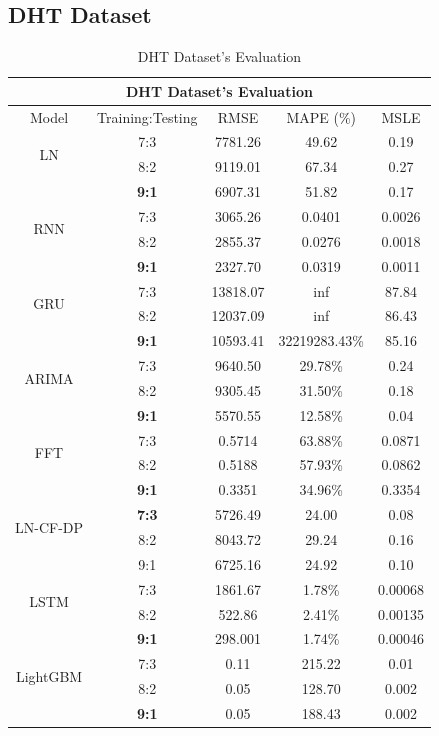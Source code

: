 \documentclass{ieeeojies}
\begin{document}
\subsection{DHT Dataset} 
\begin{table}[H]
    \centering
    \begin{tabular}{|c|c|c|c|c|}
         \hline
         \multicolumn{5}{|c|}{\textbf{DHT Dataset's Evaluation}}\\
         \hline
         \centering Model & Training:Testing & RMSE & MAPE (\%) & MSLE\\
         \hline
         \multirow{2}{*}{LN}& 7:3 & 7781.26 & 49.62 & 0.19\\ & 8:2 & 9119.01 & 67.34 & 0.27\\ & \textbf{9:1}& 6907.31& 51.82 & 0.17\\
         \hline
         \multirow{2}{*}{RNN} & 7:3&3065.26&0.0401&0.0026\\ & 8:2&2855.37&0.0276&0.0018\\ & \textbf{9:1} &2327.70 &0.0319 & 0.0011\\
         \hline
         \multirow{2}{*}{GRU} & 7:3	& 13818.07 & inf & 87.84 \\ & 8:2 & 12037.09 & inf & 86.43 \\ & \textbf{9:1} & 10593.41 & 32219283.43\% & 85.16 \\
         \hline
         \multirow{2}{*}{ARIMA} & 7:3 & 9640.50 & 29.78\% &0.24 \\ & 8:2 & 9305.45 &31.50\% & 0.18\\ & \textbf{9:1} &5570.55 &12.58\% & 0.04\\
         \hline
         \multirow{2}{*}{FFT}& 7:3	& 0.5714& 63.88\%& 0.0871\\ & 8:2 & 0.5188& 57.93\%& 0.0862\\ & \textbf{9:1} & 0.3351& 34.96\%& 0.3354\\
         \hline
         \multirow{2}{*}{LN-CF-DP} & \textbf{7:3} & 5726.49&24.00&0.08 \\ & {8:2} &8043.72& 29.24& 0.16\\ & 9:1 &6725.16&24.92&0.10\\
         \hline
         \multirow{2}{*}{LSTM}& 7:3& 1861.67& 1.78\%& 0.00068\\ & 8:2 & 522.86& 2.41\%& 0.00135\\ & \textbf{9:1}& 298.001& 1.74\%& 0.00046\\
         \hline
         \multirow{2}{*}{LightGBM}& 7:3& 0.11& 215.22 & 0.01\\ & 8:2 & 0.05& 128.70 & 0.002\\ & \textbf{9:1}& 0.05& 188.43 & 0.002\\
         \hline
    \end{tabular}
    \caption{DHT Dataset's Evaluation}
    \label{dhtresult}
\end{table}
\end{document}
